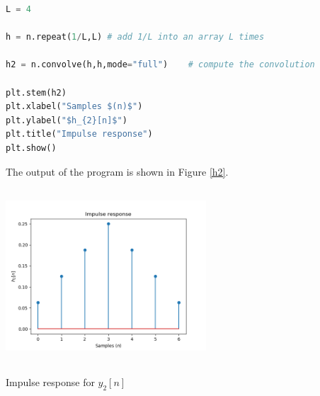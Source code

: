 \begin{enumerate}
\begin{enumerate}[a)]
\begin{lstlisting}[language=Python, caption=Simple convolution,label=code12_1]
L = 4

h = n.repeat(1/L,L) # add 1/L into an array L times

h2 = n.convolve(h,h,mode="full")    # compute the convolution

plt.stem(h2)
plt.xlabel("Samples $(n)$")
plt.ylabel("$h_{2}[n]$")
plt.title("Impulse response")
plt.show()
\end{lstlisting}
The output of the program is shown in Figure \ref{h2}.

\begin{marginfigure}
    \includegraphics[width=7.5cm,height=6.5cm]{ch10/figures/h2.png}
    \caption{Impulse response for $y_{2}[n]$}
    \label{h2}
\end{marginfigure}

\end{enumerate}


\end{enumerate}
